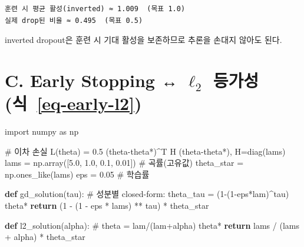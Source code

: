 \documentclass[
  letterpaper,
  DIV=11,
  numbers=noendperiod]{scrreprt}
\newenvironment{Shaded}{\begin{snugshade}}{\end{snugshade}}
\newcommand{\CommentTok}[1]{\textcolor[rgb]{0.37,0.37,0.37}{#1}}
\newcommand{\ControlFlowTok}[1]{\textcolor[rgb]{0.00,0.23,0.31}{\textbf{#1}}}
\newcommand{\DecValTok}[1]{\textcolor[rgb]{0.68,0.00,0.00}{#1}}
\newcommand{\FloatTok}[1]{\textcolor[rgb]{0.68,0.00,0.00}{#1}}
\newcommand{\ImportTok}[1]{\textcolor[rgb]{0.00,0.46,0.62}{#1}}
\newcommand{\KeywordTok}[1]{\textcolor[rgb]{0.00,0.23,0.31}{\textbf{#1}}}
\newcommand{\NormalTok}[1]{\textcolor[rgb]{0.00,0.23,0.31}{#1}}
\newcommand{\OperatorTok}[1]{\textcolor[rgb]{0.37,0.37,0.37}{#1}}
\begin{document}
\begin{verbatim}
훈련 시 평균 활성(inverted) ≈ 1.009  (목표 1.0)
실제 drop된 비율 ≈ 0.495  (목표 0.5)
\end{verbatim}

inverted dropout은 훈련 시 기대 활성을 보존하므로 추론을 손대지 않아도
된다.

\section{\texorpdfstring{C. Early Stopping ↔ \(\ell_2\) 등가성
(식~\ref{eq-early-l2})}{C. Early Stopping ↔ \textbackslash ell\_2 등가성 (식~)}}\label{c.-early-stopping-ell_2-uxb4f1uxac00uxc131-eq-early-l2}

\begin{Shaded}
\begin{Highlighting}[]
\ImportTok{import}\NormalTok{ numpy }\ImportTok{as}\NormalTok{ np}

\CommentTok{\# 이차 손실 L(theta) = 0.5 (theta{-}theta*)\^{}T H (theta{-}theta*), H=diag(lams)}
\NormalTok{lams }\OperatorTok{=}\NormalTok{ np.array([}\FloatTok{5.0}\NormalTok{, }\FloatTok{1.0}\NormalTok{, }\FloatTok{0.1}\NormalTok{, }\FloatTok{0.01}\NormalTok{])   }\CommentTok{\# 곡률(고유값)}
\NormalTok{theta\_star }\OperatorTok{=}\NormalTok{ np.ones\_like(lams)}
\NormalTok{eps }\OperatorTok{=} \FloatTok{0.05}                                \CommentTok{\# 학습률}

\KeywordTok{def}\NormalTok{ gd\_solution(tau):}
    \CommentTok{\# 성분별 closed{-}form: theta\_tau = (1{-}(1{-}eps*lam)\^{}tau) theta*}
    \ControlFlowTok{return}\NormalTok{ (}\DecValTok{1} \OperatorTok{{-}}\NormalTok{ (}\DecValTok{1} \OperatorTok{{-}}\NormalTok{ eps }\OperatorTok{*}\NormalTok{ lams) }\OperatorTok{**}\NormalTok{ tau) }\OperatorTok{*}\NormalTok{ theta\_star}

\KeywordTok{def}\NormalTok{ l2\_solution(alpha):}
    \CommentTok{\# theta = lam/(lam+alpha) theta*}
    \ControlFlowTok{return}\NormalTok{ lams }\OperatorTok{/}\NormalTok{ (lams }\OperatorTok{+}\NormalTok{ alpha) }\OperatorTok{*}\NormalTok{ theta\_star}


\end{Highlighting}
\end{Shaded}
\end{document}
